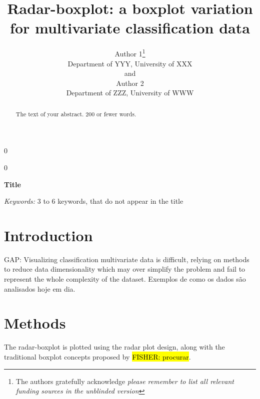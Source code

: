 \documentclass[12pt]{article}
\newcommand{\blind}{0}
\newcommand{\thetitle}{%
Radar-boxplot: a boxplot variation for multivariate classification data%
}
\begin{document}
%

\def\spacingset#1{\renewcommand{\baselinestretch}%
{#1}\small\normalsize} \spacingset{1}



\blind
{
  \title{\bf \thetitle}
\author{Author 1\thanks{
    The authors gratefully acknowledge \textit{please remember to list all relevant funding sources in the unblinded version}}\hspace{.2cm}\\
    Department of YYY, University of XXX\\
    and \\
    Author 2 \\
    Department of ZZZ, University of WWW}
  \maketitle
} \fi
\blind
{
  \bigskip
  \bigskip
  \bigskip
  \begin{center}
    {\LARGE\bf Title}
\end{center}
  \medskip
} \fi

\bigskip
\begin{abstract}
  The text of your abstract.  200 or fewer words.
\end{abstract}
\noindent%
{\it Keywords:}  3 to 6 keywords, that do not appear in the title
\vfill

\newpage
\spacingset{1.45} %

\section{Introduction}
\label{sec:intro}
GAP: Visualizing classification multivariate data is difficult, relying on methods to reduce data dimensionality which may over simplify the problem and fail to represent the whole complexity of the dataset. 
Exemplos de como os dados são analisados hoje em dia.


\section{Methods}
\label{sec:meth}
The radar-boxplot is plotted using the radar plot design, along with the traditional boxplot concepts proposed by \hl{FISHER: procurar}. 
\end{document}
